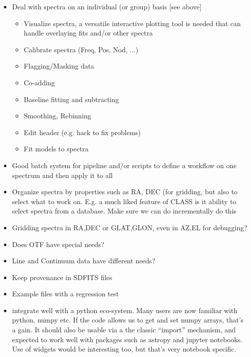 \documentclass[12pt,a4paper]{article}
\begin{document}
\begin{itemize}

\item Deal with spectra on an individual (or group) basis [see above]
  \begin{itemize}
  \item Visualize spectra, a versatile interactive plotting tool is needed
  that can handle overlaying fits and/or other spectra
  \item Calibrate spectra (Freq, Pos, Nod, ...)
  \item Flagging/Masking data
  \item Co-adding
  \item Baseline fitting and subtracting
  \item Smoothing, Rebinning
  \item Edit header (e.g. hack to fix problems)  
  \item Fit models to spectra
  \end{itemize}

\item Good batch system for pipeline and/or scripts to define a workflow on one spectrum
  and then apply it to all
  
\item Organize spectra by properties such as RA, DEC (for gridding,
  but also to select what to work on. E.g. a much liked feature of
  CLASS is it ability to select spectra from a database. Make sure we
  can do incrementally do this

\item Gridding spectra in RA,DEC or GLAT,GLON, even in AZ,EL for debugging?

\item Does OTF have special needs?

\item Line and Continuum data have different needs?

\item Keep provenance in SDFITS files

\item Example files with a regression test  

\item integrate well with a python eco-system. Many users are now familiar with
  python, numpy etc.  If the code allows us to get and set numpy arrays,
  that's a gain. It should also be usable via a the classic ``import''
  mechanism, and expected to work well with packages such as astropy and jupyter
  notebooks. Use of widgets would be interesting too, but that's very notebook
  specific.
\end{itemize}
\end{document}
